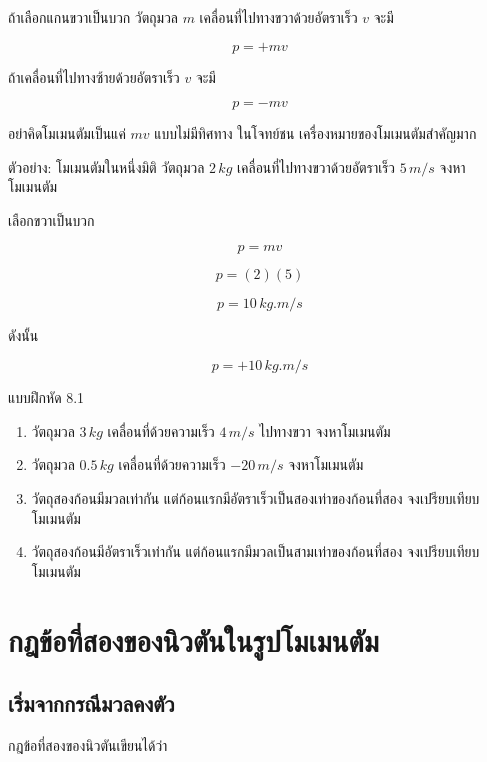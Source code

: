 ถ้าเลือกแกนขวาเป็นบวก วัตถุมวล $m$ เคลื่อนที่ไปทางขวาด้วยอัตราเร็ว $v$ จะมี

\[
p=+mv
\]

ถ้าเคลื่อนที่ไปทางซ้ายด้วยอัตราเร็ว $v$ จะมี

\[
p=-mv
\]

\begin{tcolorbox}[title=ข้อควรจำ]
อย่าคิดโมเมนตัมเป็นแค่ $mv$ แบบไม่มีทิศทาง ในโจทย์ชน เครื่องหมายของโมเมนตัมสำคัญมาก
\end{tcolorbox}

\begin{examplebox}{ตัวอย่าง: โมเมนตัมในหนึ่งมิติ}
วัตถุมวล $2\,\si{kg}$ เคลื่อนที่ไปทางขวาด้วยอัตราเร็ว $5\,\si{m/s}$ จงหาโมเมนตัม

เลือกขวาเป็นบวก

\[
p=mv
\]

\[
p=(2)(5)
\]

\[
p=10\,\si{kg.m/s}
\]

ดังนั้น

\[
\boxed{p=+10\,\si{kg.m/s}}
\]
\end{examplebox}

\begin{exercisebox}{แบบฝึกหัด 8.1}
\begin{enumerate}
    \item วัตถุมวล $3\,\si{kg}$ เคลื่อนที่ด้วยความเร็ว $4\,\si{m/s}$ ไปทางขวา จงหาโมเมนตัม
    \item วัตถุมวล $0.5\,\si{kg}$ เคลื่อนที่ด้วยความเร็ว $-20\,\si{m/s}$ จงหาโมเมนตัม
    \item วัตถุสองก้อนมีมวลเท่ากัน แต่ก้อนแรกมีอัตราเร็วเป็นสองเท่าของก้อนที่สอง จงเปรียบเทียบโมเมนตัม
    \item วัตถุสองก้อนมีอัตราเร็วเท่ากัน แต่ก้อนแรกมีมวลเป็นสามเท่าของก้อนที่สอง จงเปรียบเทียบโมเมนตัม
\end{enumerate}
\end{exercisebox}

\section{กฎข้อที่สองของนิวตันในรูปโมเมนตัม}

\subsection{เริ่มจากกรณีมวลคงตัว}

กฎข้อที่สองของนิวตันเขียนได้ว่า

